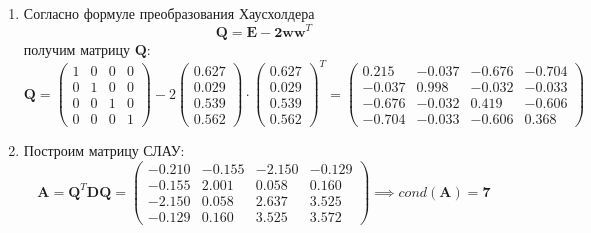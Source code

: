 \begin{enumerate}
\item Согласно формуле преобразования Хаусхолдера
\begin{equation}
    \mathbf{Q = E - 2ww}^T
\end{equation}
получим матрицу $\mathbf{Q}$:
\begin{equation}
    \mathbf{Q} =
    \begin{pmatrix}
        1 & 0 & 0 & 0 \\
        0 & 1 & 0 & 0 \\
        0 & 0 & 1 & 0 \\
        0 & 0 & 0 & 1
    \end{pmatrix} - 2
    \begin{pmatrix}
        0.627 \\
        0.029 \\
        0.539 \\
        0.562
    \end{pmatrix} \cdot
    \begin{pmatrix}
        0.627 \\
        0.029 \\
        0.539 \\
        0.562
    \end{pmatrix} ^T =
    \begin{pmatrix}
        0.215 & -0.037 & -0.676 & -0.704 \\
       -0.037 &  0.998 & -0.032 & -0.033 \\
       -0.676 & -0.032 &  0.419 & -0.606 \\
       -0.704 & -0.033 & -0.606 &  0.368
    \end{pmatrix}
\end{equation}

\item Построим матрицу СЛАУ:
\begin{equation}
    \mathbf{A}=\mathbf{Q}^T\mathbf{DQ} =
    \begin{pmatrix}
        -0.210&-0.155&-2.150&-0.129\\
        -0.155& 2.001& 0.058& 0.160\\
        -2.150& 0.058& 2.637& 3.525\\
        -0.129& 0.160& 3.525& 3.572
    \end{pmatrix} \implies cond(\mathbf{A}) = \mathbf{7}
\end{equation}


\end{enumerate}
